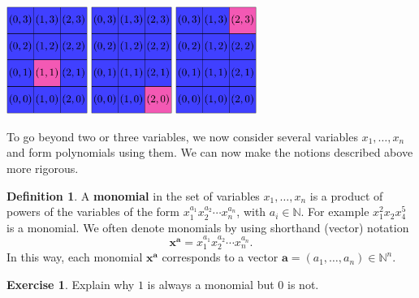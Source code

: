 \documentclass[11pt]{amsart}
\newcommand{\N}{{\mathbb N}}
\newcommand{\ba}{{\mathbf a}}
\newcommand{\bx}{{\mathbf x}}
\theoremstyle{plain} %
\theoremstyle{definition}
\newtheorem{defn}[thm]{Definition}
\newtheorem{ex}[thm]{Example}
\newtheorem{exer}[thm]{Exercise}
\theoremstyle{remark}
\numberwithin{equation}{section}  %
\begin{document}
\begin{center}
	\includegraphics[height=3.5cm]{Pictures/2D_3_4_<1,1>.pdf}
	\qquad 
	\includegraphics[height=3.5cm]{Pictures/2D_3_4_<2,0>.pdf}
	\qquad 
	\includegraphics[height=3.5cm]{Pictures/2D_3_4_<2,3>.pdf}
\end{center}

To go beyond two or three variables, we now consider several variables $x_1, \ldots, x_n$ and form polynomials using them. We can now make the notions described above more rigorous.
\begin{tcolorbox}
\begin{defn} A {\bf monomial} in the set of  variables $x_1, \ldots, x_n$  is  a product of powers of the variables of the form $x_1^{a_1}x_2^{a_2} \cdots x_n^{a_n}$, with $a_i\in \N$. For example $x_1^2x_2x_4^5$ is a monomial. 
We often denote monomials by using shorthand (vector) notation
\[
\bx^\ba =x_1^{a_1}x_2^{a_2} \cdots x_n^{a_n}.
\]
In this way, each monomial $\bx^\ba$ corresponds to a vector $\ba=(a_1,\ldots, a_n)\in \N^n$. 
\end{defn}
\end{tcolorbox}

\begin{tcolorbox}[reset]
\begin{exer}
Explain why $1$ is always a monomial but $0$ is not.
\end{exer}
\end{tcolorbox}
\end{document}
